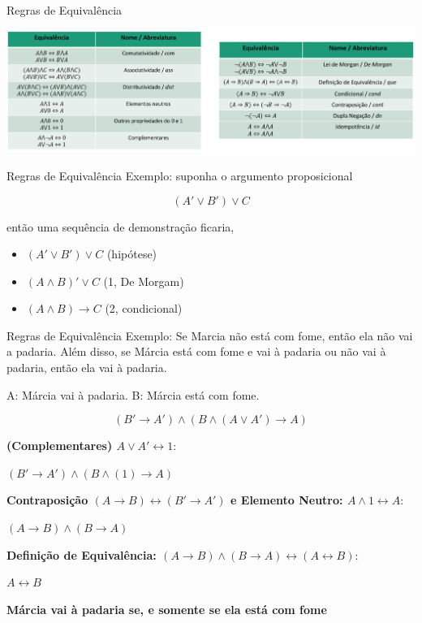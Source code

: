 \documentclass[aspectratio=169]{beamer}
\begin{document}
\begin{frame}{Regras de Equivalência}

    \begin{center}
        \includegraphics[width=.9\linewidth]{figs/equivalencias.png}
    \end{center}

\end{frame}

\begin{frame}{Regras de Equivalência}
    Exemplo: suponha o argumento proposicional

    \[ (A' \vee B') \vee C \]

    então uma sequência de demonstração ficaria,
    \vspace{2mm}

    \begin{itemize}
        \item $ (A' \vee B') \vee C $   (hipótese)
        \item $ (A \wedge B)' \vee C $    (1, De Morgam)
        \item $ (A \wedge B) \rightarrow C $    (2, condicional)
    \end{itemize}
\end{frame}

\begin{frame}{Regras de Equivalência}
    Exemplo: Se Marcia não está com fome, então ela não vai a padaria. Além disso,
    se Márcia está com fome e vai à padaria ou não vai à padaria, então
    ela vai à padaria.

    A: Márcia vai à padaria.
    B: Márcia está com fome.

    \pause

    \[ (B' \rightarrow A') \wedge (B \wedge (A \vee A') \rightarrow A)\]
    \pause

    \textbf{(Complementares) $ A \vee A' \leftrightarrow 1$}:

    $(B' \rightarrow A') \wedge (B \wedge (1) \rightarrow A)$
    \pause

    \textbf{Contraposição $ (A \rightarrow B) \leftrightarrow (B' \rightarrow A')$ e Elemento Neutro: $A \wedge 1 \leftrightarrow A$}:

    $(A \rightarrow B) \wedge (B \rightarrow A)$
    \pause

    \textbf{Definição de Equivalência: $ (A \rightarrow B) \wedge (B \rightarrow A) \leftrightarrow (A \leftrightarrow B)$}:

    $ A \leftrightarrow B$
    \pause

    \vspace*{4mm}
    \textbf{Márcia vai à padaria se, e somente se ela está com fome}

\end{frame}
\end{document}
